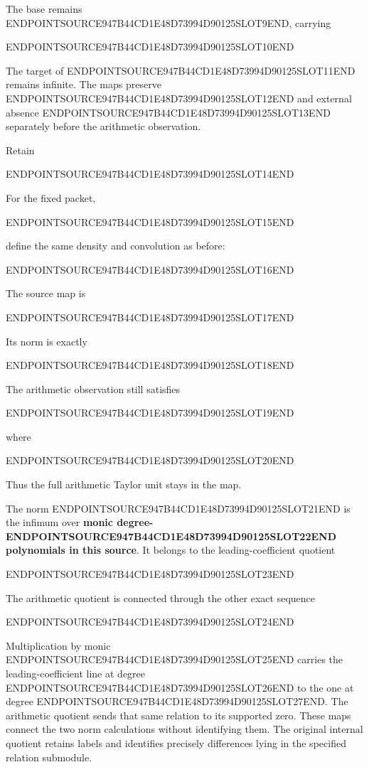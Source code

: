 The base remains ENDPOINTSOURCE947B44CD1E48D73994D90125SLOT9END, carrying

ENDPOINTSOURCE947B44CD1E48D73994D90125SLOT10END

The target of ENDPOINTSOURCE947B44CD1E48D73994D90125SLOT11END remains infinite. The maps preserve ENDPOINTSOURCE947B44CD1E48D73994D90125SLOT12END and external absence ENDPOINTSOURCE947B44CD1E48D73994D90125SLOT13END separately before the arithmetic observation.

Retain

ENDPOINTSOURCE947B44CD1E48D73994D90125SLOT14END

For the fixed packet,

ENDPOINTSOURCE947B44CD1E48D73994D90125SLOT15END

define the same density and convolution as before:

ENDPOINTSOURCE947B44CD1E48D73994D90125SLOT16END

The source map is

ENDPOINTSOURCE947B44CD1E48D73994D90125SLOT17END

Its norm is exactly

ENDPOINTSOURCE947B44CD1E48D73994D90125SLOT18END

The arithmetic observation still satisfies

ENDPOINTSOURCE947B44CD1E48D73994D90125SLOT19END

where

ENDPOINTSOURCE947B44CD1E48D73994D90125SLOT20END

Thus the full arithmetic Taylor unit stays in the map.

The norm ENDPOINTSOURCE947B44CD1E48D73994D90125SLOT21END is the infimum over \textbf{monic degree-ENDPOINTSOURCE947B44CD1E48D73994D90125SLOT22END polynomials in this source}. It belongs to the leading-coefficient quotient

ENDPOINTSOURCE947B44CD1E48D73994D90125SLOT23END

The arithmetic quotient is connected through the other exact sequence

ENDPOINTSOURCE947B44CD1E48D73994D90125SLOT24END

Multiplication by monic ENDPOINTSOURCE947B44CD1E48D73994D90125SLOT25END carries the leading-coefficient line at degree ENDPOINTSOURCE947B44CD1E48D73994D90125SLOT26END to the one at degree ENDPOINTSOURCE947B44CD1E48D73994D90125SLOT27END. The arithmetic quotient sends that same relation to its supported zero. These maps connect the two norm calculations without identifying them. The original internal quotient retains labels and identifies precisely differences lying in the specified relation submodule.

